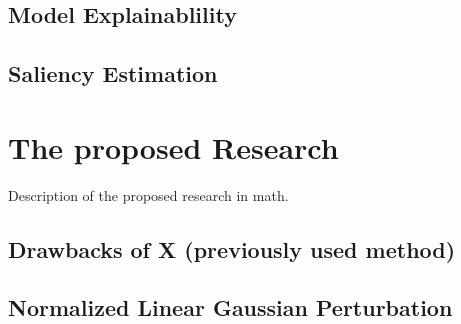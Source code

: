 \subsection{Model Explainablility}

\subsection{Saliency Estimation}


\section{The proposed Research} Description of the proposed research in math.
\subsection{Drawbacks of X (previously used method)}
\subsection{Normalized Linear Gaussian Perturbation}
